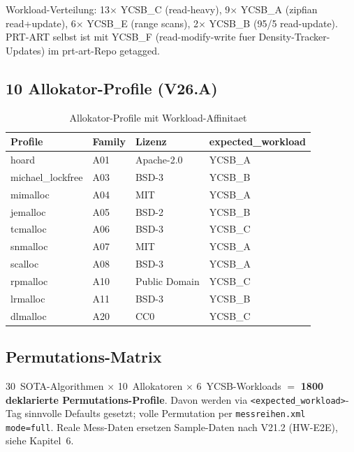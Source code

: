 Workload-Verteilung: 13$\times$ YCSB\_C (read-heavy), 9$\times$ YCSB\_A
(zipfian read+update), 6$\times$ YCSB\_E (range scans), 2$\times$ YCSB\_B
(95/5 read-update). PRT-ART selbst ist mit YCSB\_F (read-modify-write fuer
Density-Tracker-Updates) im prt-art-Repo getagged.

\subsection{10 Allokator-Profile (V26.A)}

\begin{table}[!htbp]
\caption{Allokator-Profile mit Workload-Affinitaet}
\label{tab:allocator-profiles}
\centering
\small
\begin{tabular}{|l|l|l|l|}
\hline
\textbf{Profile} & \textbf{Family} & \textbf{Lizenz} & \textbf{expected\_workload} \\
\hline
hoard            & A01 & Apache-2.0      & YCSB\_A \\
michael\_lockfree & A03 & BSD-3           & YCSB\_B \\
mimalloc         & A04 & MIT             & YCSB\_A \\
jemalloc         & A05 & BSD-2           & YCSB\_B \\
tcmalloc         & A06 & BSD-3           & YCSB\_C \\
snmalloc         & A07 & MIT             & YCSB\_A \\
scalloc          & A08 & BSD-3           & YCSB\_A \\
rpmalloc         & A10 & Public Domain   & YCSB\_C \\
lrmalloc         & A11 & BSD-3           & YCSB\_B \\
dlmalloc         & A20 & CC0             & YCSB\_C \\
\hline
\end{tabular}
\end{table}

\subsection{Permutations-Matrix}

30~SOTA-Algorithmen $\times$ 10~Allokatoren $\times$ 6~YCSB-Workloads
$=$ \textbf{1800 deklarierte Permutations-Profile}. Davon werden via
\texttt{<expected\_workload>}-Tag sinnvolle Defaults gesetzt; volle
Permutation per \texttt{messreihen.xml mode=full}. Reale Mess-Daten
ersetzen Sample-Daten nach V21.2 (HW-E2E), siehe Kapitel~6.

